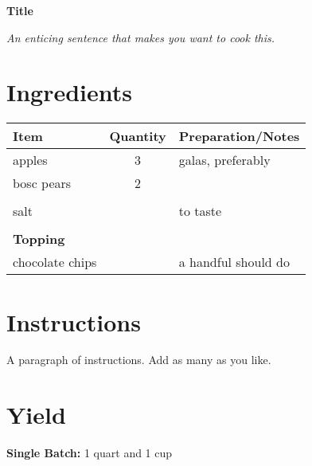 \documentclass{/home/luke/Reference/Code/Source/latex-python/usr/local/lib/latex_python/recipes/examples/templateRecipe}
\begin{document}
    \begin{center}
        {\Large \textbf{Title}}
        
        \small\emph{An enticing sentence that makes you want to cook this.}
    \end{center}
    
    \section*{Ingredients}
    \begin{center}
        
            \begin{tabular}{l c l}
                \textbf{Item} & \textbf{Quantity} & \textbf{Preparation/Notes} \\
                \hline
                apples & 3 & \parbox[t]{0.4\textwidth}{galas, preferably} \\
bosc pears & 2 & \parbox[t]{0.4\textwidth}{} \\
 \\
salt &  & \parbox[t]{0.4\textwidth}{to taste} \\
 \\
\textbf{Topping} \\
chocolate chips &  & \parbox[t]{0.4\textwidth}{a handful should do}
            \end{tabular}
        
    \end{center}
    
    \section*{Instructions}
    A paragraph of instructions. Add as many as you like.
    
    \section*{Yield}
    \textbf{Single Batch:} 1  quart and 1  cup
\end{document}
